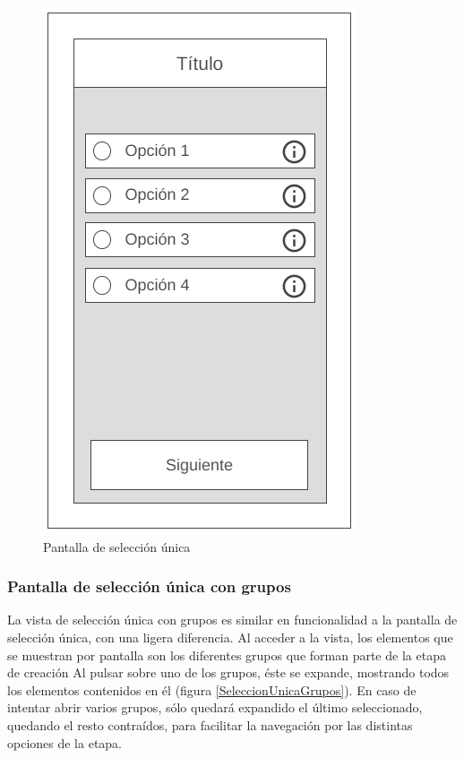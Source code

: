 \begin{figure}[H]
    \centering
    \includegraphics[scale=0.3]{Figures/Mockups/Mock_SeleccionUnica.png}
    \caption{Pantalla de selección única}
    \label{SeleccionUnica}    
\end{figure}

\subsubsection{Pantalla de selección única con grupos}
La vista de selección única con grupos es similar en funcionalidad a la pantalla de selección única, con una ligera diferencia.
Al acceder a la vista, los elementos que se muestran por pantalla son los diferentes grupos que forman parte de la etapa de creación
Al pulsar sobre uno de los grupos, éste se expande, mostrando todos los elementos contenidos en él (figura \ref*{SeleccionUnicaGrupos}). 
En caso de intentar abrir varios grupos, sólo quedará expandido el último seleccionado, quedando el resto contraídos, para facilitar la 
navegación por las distintas opciones de la etapa.

